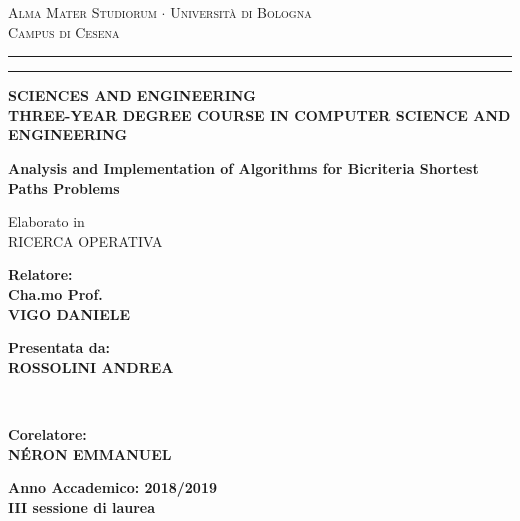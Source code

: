 \documentclass[a4paper,11pt]{report}
\begin{document}
	
	\begin{titlepage}
		\begin{center}
			{{\large{\textsc{Alma Mater Studiorum $\cdot$ Universit\`a di
							Bologna\\Campus di Cesena}}}} \rule[0.2cm]{15.8cm}{0.2mm}
			\rule[0.5cm]{15.8cm}{0.6mm}
			{\small 			{{\bf SCIENCES AND ENGINEERING\\
						THREE-YEAR DEGREE COURSE IN COMPUTER SCIENCE AND ENGINEERING
			}}}
		\end{center}
		\vspace{5mm}
		\begin{center}
			{\LARGE{\bf Analysis and Implementation of Algorithms for Bicriteria Shortest Paths Problems}}\\
			\vspace{3mm}
		\end{center}
		\vspace{3mm}
		\begin{center}
			\large{Elaborato in\\
				RICERCA OPERATIVA}
		\end{center}
		\vspace{30mm}
		\par
		\noindent
		\begin{minipage}[t]{0.47\textwidth}
			{\large{\bf Relatore:\\Cha.mo Prof.\\
					VIGO DANIELE}}
		\end{minipage}
		\vspace{5mm}
		\begin{minipage}[t]{0.47\textwidth}\raggedleft
			{\large{\bf Presentata da:\\
					ROSSOLINI ANDREA}}
		\end{minipage}\\
		\begin{minipage}[t]{1.5\textwidth}\raggedright
			{\large{\bf Corelatore:\\
					N\'ERON EMMANUEL}}
		\end{minipage}
		\hfill
		\vspace{20mm}
		\begin{center}
			{\large{\bf Anno Accademico: 2018/2019\\III sessione di laurea}}%
		\end{center}
	\end{titlepage}
\end{document}
